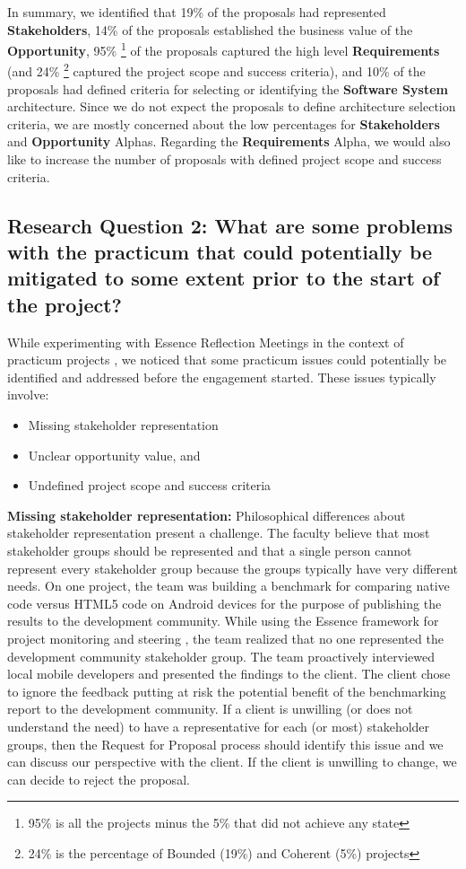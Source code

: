 \documentclass[conference]{IEEEtran}
\begin{document}
In summary, we identified that 19\% of the proposals had represented
\textbf{Stakeholders}, 14\% of the proposals established the business value
of the \textbf{Opportunity}, 95\% \footnote{95\% is all the projects minus the 5\% that did not achieve any state} of the proposals captured the high level \textbf{Requirements} (and 24\% \footnote{24\% is the percentage of Bounded (19\%) and Coherent (5\%) projects} captured the project scope and success criteria), and 10\% of the proposals had defined criteria for selecting or identifying the \textbf{Software System} architecture. Since we do not expect the proposals to define architecture selection criteria, we are mostly concerned about the low
percentages for \textbf{Stakeholders} and \textbf{Opportunity} Alphas. Regarding
the \textbf{Requirements} Alpha, we would also like to increase the number of
proposals with defined project scope and success criteria.


\subsection{Research Question 2: What are some problems with the practicum that could potentially be mitigated to some extent prior to the start of the project?
}

While experimenting with Essence Reflection Meetings in the
context of practicum projects \cite{EASE2014, ICSE2014}, we
noticed that some practicum issues could potentially be identified and
addressed before the engagement started. These issues typically involve:

\begin{itemize}
\itemsep1pt\parskip0pt
\item
  Missing stakeholder representation
\item
  Unclear opportunity value, and
\item
  Undefined project scope and success criteria
\end{itemize}

\textbf{Missing stakeholder representation:} Philosophical differences about
stakeholder representation present a challenge. The faculty believe that
most stakeholder groups should be represented and that a single
person cannot represent every stakeholder group because the groups
typically have very different needs. On one project, the team was building
a benchmark for comparing native code versus HTML5 code
on Android devices for the purpose of publishing the results to the
development community. While using the Essence framework for project
monitoring and steering \cite{ICSE2014}, the team
realized that no one represented the development community stakeholder
group. The team proactively interviewed local mobile developers and
presented the findings to the client. The client chose to ignore the
feedback putting at risk the potential benefit of the benchmarking
report to the development community. If a client is unwilling (or does
not understand the need) to have a representative for each (or most)
stakeholder groups, then the Request for Proposal process should
identify this issue and we can discuss our perspective with the client. If
the client is unwilling to change, we can decide to reject the
proposal.
\end{document}

